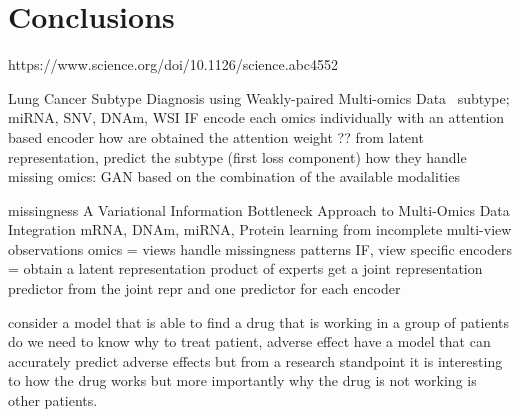 \documentclass[../main.tex]{subfiles}
\begin{document}
\chapter{Conclusions}
\minitocpage

https://www.science.org/doi/10.1126/science.abc4552

Lung Cancer Subtype Diagnosis using Weakly-paired Multi-omics Data~\cite{Wang2022}
subtype; miRNA, SNV, DNAm, WSI
IF
encode each omics individually with an attention based encoder
how are obtained the attention weight ??
from latent representation, predict the subtype (first loss component)
how they handle missing omics: GAN based on the combination of the available modalities


missingness
A Variational Information Bottleneck Approach to Multi-Omics Data Integration
\cite{Lee2021AVI}
mRNA, DNAm, miRNA, Protein
learning from incomplete multi-view observations
omics = views handle missingness patterns
IF, view specific encoders = obtain a latent representation
product of experts get a joint representation
predictor from the joint repr and one predictor for each encoder


consider a model that is able to find a drug that is working in a group of patients
do we need to know why to treat patient, adverse effect have a model that can accurately predict adverse effects
but from a research standpoint it is interesting to how the drug works but more importantly why the drug is not working is other patients. 
\end{document}
